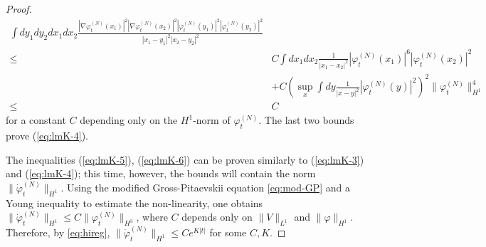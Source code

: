 \documentclass[11pt,a4paper]{article}
\newcommand{\done}{}
\newcommand{\ekt}{e^{K\lvert t\rvert}}	%
\newcommand{\norm}[1]{\lVert#1\rVert}	%
\newcommand{\ph}{\varphi_t^{(N)}}	%
\newcommand{\phdot}{\dot{\varphi}_t^{(N)}}	%
\begin{document}
\begin{proof}
\[\begin{split}
\int dy_1 dy_2 dx_1 dx_2  \frac{ |\nabla\varphi_t^{(N)} (x_1)|^2 |\nabla \varphi_t^{(N)} (x_2)|^2 
|\varphi_t^{(N)} (y_1)|^2 |\varphi_t^{(N)} (y_2)|^2}{|x_1 - y_1|^2 |x_2 - y_2|^2}  \\ \leq \; &C \int dx_1 dx_2 \frac{1}{|x_1 - x_2|^2} |\varphi_t^{(N)} (x_1)|^6 |\varphi_t^{(N)} (x_2)|^2 \\ &+ C \left( \sup_x \int dy \frac{1}{|x-y|^2} |\varphi_t^{(N)} (y)|^2 \right)^2 \| \varphi_t^{(N)} \|_{H^1}^4 \\ \leq \; & C 
\end{split} \]
for a constant $C$ depending only on the $H^1$-norm of $\varphi_t^{(N)}$. The last two bounds prove (\ref{eq:lmK-4}).\done 

The inequalities (\ref{eq:lmK-5}), (\ref{eq:lmK-6}) can be proven similarly to (\ref{eq:lmK-3}) and (\ref{eq:lmK-4}); this time, however, the bounds will contain the norm $\| \dot{\varphi}_t^{(N)} \|_{H^1}$. Using the modified Gross-Pitaevskii equation \eqref{eq:mod-GP} and a Young inequality to estimate the non-linearity, one obtains $\norm{\phdot}_{H^1} \leq  C \norm{\ph}_{H^3}$, where $C$ depends only on $\norm{V}_{L^1}$ and $\norm{\varphi}_{H^1}$. Therefore, by \eqref{eq:hireg}, $\norm{\phdot}_{H^1} \leq C \ekt$ for some $C, K$.
\end{proof}
\end{document}
